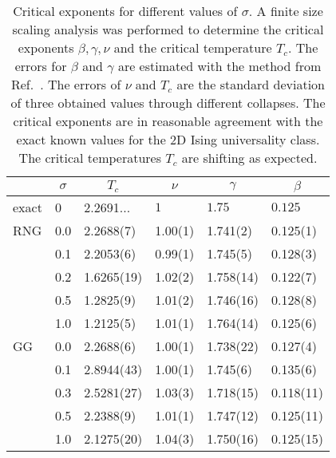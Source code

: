 \begin{table}[htb]
    \begin{ruledtabular}
        \begin{tabular}{l l l l l l}
             & \multicolumn{1}{c}{\(\sigma\)} & \multicolumn{1}{c}{\(T_c\)} & \multicolumn{1}{c}{\(\nu\)} & \multicolumn{1}{c}{\(\gamma\)} & \multicolumn{1}{c}{\(\beta\)}\\
            \hline
            exact        & 0   & 2.2691... & \(1\)    & \(1.75\) & \(0.125\)\\
            \hline
            RNG          & 0.0 & 2.2688(7) & 1.00(1) & 1.741(2) & 0.125(1) \\
                         & 0.1 & 2.2053(6) & 0.99(1) & 1.745(5) & 0.128(3) \\
                         & 0.2 & 1.6265(19)& 1.02(2) & 1.758(14)& 0.122(7)\\
                         & 0.5 & 1.2825(9) & 1.01(2) & 1.746(16)& 0.128(8)\\
                         & 1.0 & 1.2125(5) & 1.01(1) & 1.764(14)& 0.125(6)\\
            \hline
            GG           & 0.0 & 2.2688(6) & 1.00(1) & 1.738(22)& 0.127(4)\\
                         & 0.1 & 2.8944(43)& 1.00(1) & 1.745(6) & 0.135(6) \\
                         & 0.3 & 2.5281(27)& 1.03(3) & 1.718(15)& 0.118(11)\\
                         & 0.5 & 2.2388(9) & 1.01(1) & 1.747(12)& 0.125(11)\\
                         & 1.0 & 2.1275(20)& 1.04(3) & 1.750(16)& 0.125(15)\\
        \end{tabular}
    \end{ruledtabular}
    \caption[Critical Exponents for Different $\sigma$]{
        Critical exponents for different values of \(\sigma\). A finite size
        scaling analysis was performed to determine the critical
        exponents \(\beta, \gamma, \nu\) and the critical temperature
        \(T_c\). The errors for \(\beta\) and \(\gamma\) are estimated
        with the method from Ref.~\cite{autoscale2009}. The errors of
        \(\nu\) and \(T_c\) are the standard deviation of three obtained
        values through different collapses. The critical exponents
        are in reasonable agreement with the exact known values for the 2D Ising
        universality class. The critical temperatures $T_c$ are shifting
        as expected.
    }
    \label{tab:critExp}
\end{table}

